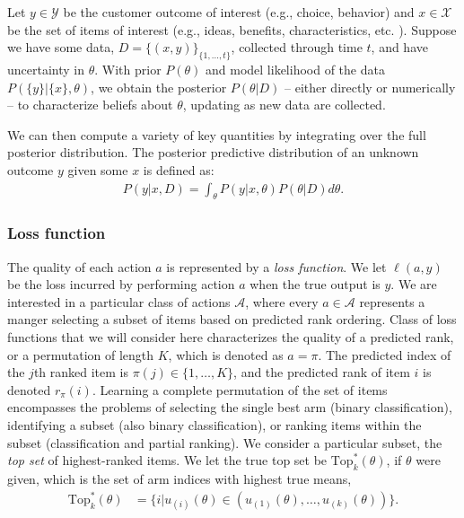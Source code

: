 \documentclass[blindrev]{informs3} %
\newcommand{\numitems}{K}
\newcommand{\topset}{\text{Top}_k}
\begin{document}
Let $y \in \mathcal{Y}$ be the customer outcome of interest (e.g., choice, behavior) and $x \in \mathcal{X}$ be the set of items of interest (e.g., ideas, benefits, characteristics, etc. ). Suppose we have some data, $D = \{(x,y)\}_{\{1,...,t\}}$, collected through time $t$, and have uncertainty in $\theta$. With prior $P(\theta)$ and model likelihood of the data $P(\{y\}|\{x\},\theta)$, we obtain the posterior $P(\theta|D)$ -- either directly or numerically -- to characterize beliefs about $\theta$, updating as new data are collected.

We can then compute a variety of key quantities by integrating over the full posterior distribution. The posterior predictive distribution of an unknown outcome $y$ given some $x$ is defined as:
\begin{align} 
P(y|x,D) = \int_\theta P(y|x,\theta)P(\theta|D)d\theta .
\end{align}

\subsubsection{Loss function}

The quality of each action $a$ is represented by a \emph{loss function}. We let $\ell(a,y)$ be the loss incurred by performing action $a$ when the true output is $y$. We are interested in a particular class of actions $\mathcal{A}$, where every $a \in \mathcal{A}$ represents a manger selecting a subset of items based on predicted rank ordering. Class of loss functions that we will consider here characterizes the quality of a predicted rank, or a permutation of length $\numitems$, which is denoted as $a=\pi$. The predicted index of the $j$th ranked item is $\pi(j) \in \{1,\ldots,\numitems\}$, and the predicted rank of item $i$ is denoted $r_\pi(i)$. Learning a complete permutation of the set of items encompasses the problems of selecting the single best arm (binary classification), identifying a subset (also binary classification), or ranking items within the subset (classification and partial ranking). We consider a particular subset, the \emph{top set} of highest-ranked items. We let the true top set be $\topset^{*}(\theta)$, if $\theta$ were given, which is the set of arm indices with highest true means, 
\begin{align}
\topset^{*}(\theta) &= \{i | u_{(i)}(\theta) \in ( u_{(1)}(\theta),\ldots,u_{(k)}(\theta) ) \}.
\end{align}
\end{document}
